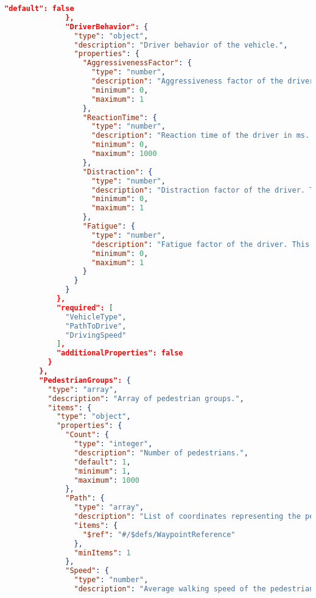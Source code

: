 \begin{lstlisting}[language=json,firstnumber=1]
                "default": false
              },
              "DriverBehavior": {
                "type": "object",
                "description": "Driver behavior of the vehicle.",
                "properties": {
                  "AggressivenessFactor": {
                    "type": "number",
                    "description": "Aggressiveness factor of the driver. This influences e.g. the acceleration and deceleration of the vehicle and the likelihood of overtaking other vehicles.",
                    "minimum": 0,
                    "maximum": 1
                  },
                  "ReactionTime": {
                    "type": "number",
                    "description": "Reaction time of the driver in ms. This influences e.g. the reaction time to obstacles and traffic lights.",
                    "minimum": 0,
                    "maximum": 1000
                  },
                  "Distraction": {
                    "type": "number",
                    "description": "Distraction factor of the driver. This influences e.g. the likelihood of the driver being distracted by a phone call or a passenger.",
                    "minimum": 0,
                    "maximum": 1
                  },
                  "Fatigue": {
                    "type": "number",
                    "description": "Fatigue factor of the driver. This influences e.g. the likelihood of the driver falling asleep.",
                    "minimum": 0,
                    "maximum": 1
                  }
                }
              }
            },
            "required": [
              "VehicleType",
              "PathToDrive",
              "DrivingSpeed"
            ],
            "additionalProperties": false
          }
        },
        "PedestrianGroups": {
          "type": "array",
          "description": "Array of pedestrian groups.",
          "items": {
            "type": "object",
            "properties": {
              "Count": {
                "type": "integer",
                "description": "Number of pedestrians.",
                "default": 1,
                "minimum": 1,
                "maximum": 1000
              },
              "Path": {
                "type": "array",
                "description": "List of coordinates representing the pedestrian's path.",
                "items": {
                  "$ref": "#/$defs/WaypointReference"
                },
                "minItems": 1
              },
              "Speed": {
                "type": "number",
                "description": "Average walking speed of the pedestrians in km/h.",

\end{lstlisting}
